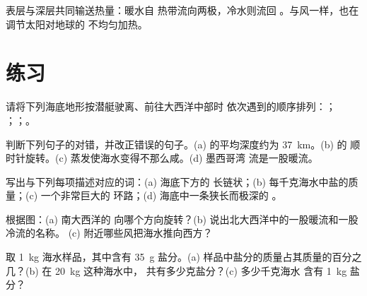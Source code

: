 表层与深层共同输送热量：暖水自
热带流向两极，冷水则流回
。与风一样，也在调节太阳对地球的
不均匀加热。

\section{练习}

\begin{exercise}[$\star$]\label{exo:g8:the-oceans:1}
请将下列海底地形按潜艇驶离、前往大西洋中部时
依次遇到的顺序排列：；
；；。
\end{exercise}

\begin{exercise}[$\star$]\label{exo:g8:the-oceans:2}
判断下列句子的对错，并改正错误的句子。(a) 的平均深度约为
\qty{37}{km}。(b) 的
顺时针旋转。(c) 蒸发使海水变得不那么咸。(d) 墨西哥湾
流是一股暖流。
\end{exercise}

\begin{exercise}[$\star$]\label{exo:g8:the-oceans:3}
写出与下列每项描述对应的词：(a) 海底下方的
长链状；(b) 每千克海水中盐的质量；(c) 一个非常巨大的
环路；(d) 海底中一条狭长而极深的
。
\end{exercise}

\begin{exercise}[$\star$]\label{exo:g8:the-oceans:4}
根据图：(a) 南大西洋的
向哪个方向旋转？(b) 说出北大西洋中的一股暖流和一股冷流的名称。
(c) 附近哪些风把海水推向西方？
\end{exercise}

\begin{exercise}[$\star\star$]\label{exo:g8:the-oceans:5}
取 \qty{1}{kg} 海水样品，其中含有 \qty{35}{g} 盐分。(a)
样品中盐分的质量占其质量的百分之几？(b) 在 \qty{20}{kg} 这种海水中，
共有多少克盐分？(c) 多少千克海水
含有 \qty{1}{kg} 盐分？
\end{exercise}

